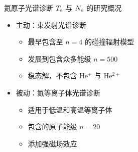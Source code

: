 \begin{CJK*}{UTF8}{kai}
\begin{frame}{氦原子光谱诊断 $T_{\rm e}$ 与 $N_{\rm e}$ 的研究概况}
	\begin{itemize}
		\item 主动：束发射光谱诊断
			\begin{itemize}
				\item 最早包含至 $n=4$ 的碰撞辐射模型 
				\item 发展到包含众多能级 $n=500$ 
				\item 稳态解，不包含 He$^+$ 与 He$^{2+}$
			\end{itemize}
		\bigskip
		\item 被动：氦等离子体光谱诊断\\ 
			\begin{itemize}
				\item 适用于低温和高温等离子体
				\item 包含的原子能级 $n=20$
				\item 添加强磁场效应
			\end{itemize}
	\end{itemize}
\end{frame}


\end{CJK*}
